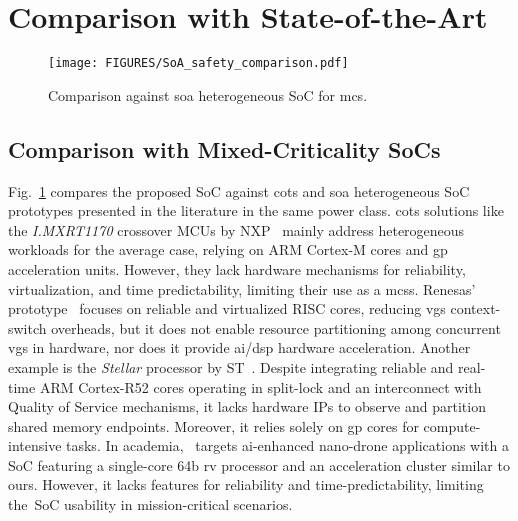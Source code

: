 \section{Comparison with State-of-the-Art}

\begin{figure}[t]
    \centering
    \texttt{[image: FIGURES/SoA\_safety\_comparison.pdf]}
    \caption{Comparison against \gls{soa} heterogeneous SoC for \gls{mcs}.}
    \label{fig:soa-safety}
\end{figure}

\subsection{Comparison with Mixed-Criticality SoCs}
\label{sec:mcs-soa}

Fig.~\ref{fig:soa-safety} compares the proposed SoC against \gls{cots} and \gls{soa} heterogeneous SoC prototypes presented in the literature in the same power class. 
%
\gls{cots} solutions like the \textit{I.MXRT1170} crossover MCUs by NXP~\cite{nxp_industrial_control} mainly address heterogeneous workloads for the average case, relying on ARM Cortex-M cores and \gls{gp} acceleration units. However, they lack hardware mechanisms for reliability, virtualization, and time predictability, limiting their use as a \glspl{mcs}. Renesas' prototype~\cite{otani2728nm600MHz2019} focuses on reliable and virtualized RISC cores, reducing \glspl{vg} context-switch overheads, but it does not enable resource partitioning among concurrent \glspl{vg} in hardware, nor does it provide \gls{ai}/\gls{dsp} hardware acceleration. Another example is the \textit{Stellar} processor by ST~\cite{grossierASILDAutomotivegradeMicrocontroller2023}. Despite integrating reliable and real-time ARM Cortex-R52 cores operating in split-lock and an interconnect with Quality of Service mechanisms, it lacks hardware IPs to observe and partition shared memory endpoints. Moreover, it relies solely on \gls{gp} cores for compute-intensive tasks. 
%
In academia,~\cite{valenteHeterogeneousRISCVBased2024} targets \gls{ai}-enhanced nano-drone applications with a SoC featuring a single-core 64b \gls{rv} processor and an acceleration cluster similar to ours. However, it lacks features for reliability and time-predictability, limiting the~SoC usability in mission-critical scenarios. 

